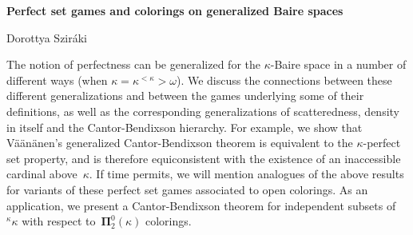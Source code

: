 \documentclass[a4paper,oneside,11pt]{article}
\begin{document}
  \thispagestyle{empty}

\begin{center}
\large{\bf 
Perfect set games and colorings on generalized Baire spaces
}
\end{center}
\begin{center} Dorottya Szir\'aki 
\end{center}

The notion of perfectness can be generalized
for the $\kappa$-Baire space
in a number of different ways (when $\kappa=\kappa^{<\kappa}>\omega$). 
We 
discuss
the connections between 
these different generalizations and between 
the games underlying some of their definitions, 
as well as 
the corresponding generalizations of 
scatteredness,
density in itself 
and the Cantor-Bendixson hierarchy.
For example, we show that V\"a\"an\"anen's generalized Cantor-Bendixson theorem is equivalent to the $\kappa$-perfect set property, and is therefore equiconsistent with the existence of an inaccessible cardinal above~$\kappa$. 
If time permits, we will mention 
analogues of the above results
for variants of these
perfect set games associated to open colorings.
As an application, we present 
a Cantor-Bendixson theorem
for independent subsets of ${}^\kappa\kappa$ with respect to~$\mathbf{\Pi}^0_2(\kappa)$ colorings.
\end{document}
